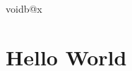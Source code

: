 \documentclass[a5paper,showtrims]{memoir}
\begin{document}
\shipout\null
\shipout\box\csname voidb@x\endcsname
\section{Hello World}
\end{document}
